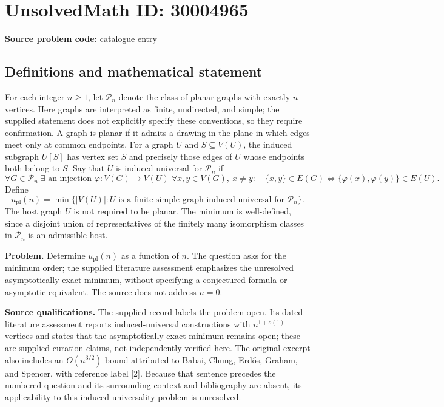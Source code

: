 \documentclass[11pt]{article}
\begin{document}
\section*{UnsolvedMath ID: 30004965}
\textbf{Source problem code:} catalogue entry
\subsection{Definitions and mathematical statement}
For each integer \(n\geq 1\), let \(\mathcal P_n\) denote the class of planar graphs with exactly \(n\) vertices. Here graphs are interpreted as finite, undirected, and simple; the supplied statement does not explicitly specify these conventions, so they require confirmation. A graph is planar if it admits a drawing in the plane in which edges meet only at common endpoints. For a graph \(U\) and \(S\subseteq V(U)\), the induced subgraph \(U[S]\) has vertex set \(S\) and precisely those edges of \(U\) whose endpoints both belong to \(S\). Say that \(U\) is induced-universal for \(\mathcal P_n\) if
\[
\forall G\in\mathcal P_n\;\exists\text{ an injection }\varphi:V(G)\longrightarrow V(U)\;\forall x,y\in V(G),\ x\ne y:\quad
\{x,y\}\in E(G)\iff \{\varphi(x),\varphi(y)\}\in E(U).
\]
Define
\[
u_{\mathrm{pl}}(n)=\min\bigl\{|V(U)|:U\text{ is a finite simple graph induced-universal for }\mathcal P_n\bigr\}.
\]
The host graph \(U\) is not required to be planar. The minimum is well-defined, since a disjoint union of representatives of the finitely many isomorphism classes in \(\mathcal P_n\) is an admissible host.

\textbf{Problem.} Determine \(u_{\mathrm{pl}}(n)\) as a function of \(n\). The question asks for the minimum order; the supplied literature assessment emphasizes the unresolved asymptotically exact minimum, without specifying a conjectured formula or asymptotic equivalent. The source does not address \(n=0\).

\textbf{Source qualifications.} The supplied record labels the problem open. Its dated literature assessment reports induced-universal constructions with \(n^{1+o(1)}\) vertices and states that the asymptotically exact minimum remains open; these are supplied curation claims, not independently verified here. The original excerpt also includes an \(O(n^{3/2})\) bound attributed to Babai, Chung, Erd\H{o}s, Graham, and Spencer, with reference label [2]. Because that sentence precedes the numbered question and its surrounding context and bibliography are absent, its applicability to this induced-universality problem is unresolved.
\end{document}
